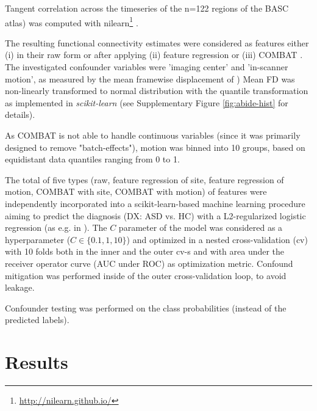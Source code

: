 \documentclass{article}
\begin{document}
Tangent correlation across the timeseries of the n=122 regions of the BASC \citep{bellec2010multi} atlas) was computed with nilearn\footnote{\href{http://nilearn.github.io/}{http://nilearn.github.io/}} \citep{huntenburg2017loading, esteve2015big}. 

The resulting functional connectivity estimates were considered as features either (i) in their raw form or after applying (ii) feature regression \citep{rao2017predictive} or (iii) COMBAT \citep{johnson2007adjusting, fortin2018harmonization}.
The investigated confounder variables were 'imaging center' and 'in-scanner motion', as measured by the mean framewise displacement of \cite{power2014methods})
Mean FD was non-linearly transformed to normal distribution with the quantile transformation \citep{beasley2009rank} as implemented in \emph{scikit-learn} \citep{pedregosa2011scikit} (see Supplementary Figure \ref{fig:abide-hist} for details).

As COMBAT is not able to handle continuous variables (since it was primarily designed to remove "batch-effects"), motion was binned into 10 groups, based on equidistant data quantiles ranging from 0 to 1.

The total of five types (raw, feature regression of site, feature regression of motion, COMBAT with site, COMBAT with motion) of features were independently incorporated into a scikit-learn-based \citep{pedregosa2011scikit} machine learning procedure aiming to predict the diagnosis (DX: ASD vs. HC) with a L2-regularized logistic regression (as e.g. in \citep{dadi2019benchmarking}). The $C$ parameter of the model was considered as a hyperparameter ($C \in \{0.1, 1, 10\}$) and optimized in a nested cross-validation (cv) with 10 folds both in the inner and the outer cv-s and with area under the receiver operator curve (AUC under ROC) as optimization metric. Confound mitigation was performed inside of the outer cross-validation loop, to avoid leakage.

Confounder testing was performed on the class probabilities (instead of the predicted labels).

\section{Results}
\end{document}
